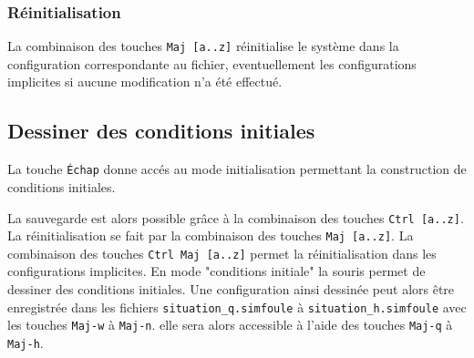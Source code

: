 \subsubsection{Réinitialisation}
La combinaison des touches \texttt{Maj [a..z]} réinitialise le système dans la configuration correspondante au fichier, eventuellement les configurations implicites si aucune modification n'a été effectué.
%
\subsection{Dessiner des conditions initiales}
La touche \texttt{Échap} donne accés au mode initialisation permettant la construction de conditions initiales.

La sauvegarde est alors possible grâce à la combinaison des touches \texttt{Ctrl [a..z]}. La réinitialisation se fait par la combinaison des touches \texttt{Maj [a..z]}. La combinaison des touches \texttt{Ctrl Maj [a..z]} permet la réinitialisation dans les configurations implicites.
En mode "conditions initiale" la souris permet de dessiner des conditions initiales. Une configuration ainsi dessinée peut alors être enregistrée dans les fichiers \texttt{situation\_q.simfoule} à \texttt{situation\_h.simfoule} avec les touches \texttt{Maj-w} à \texttt{Maj-n}. elle sera alors accessible à l'aide des touches \texttt{Maj-q} à \texttt{Maj-h}.











